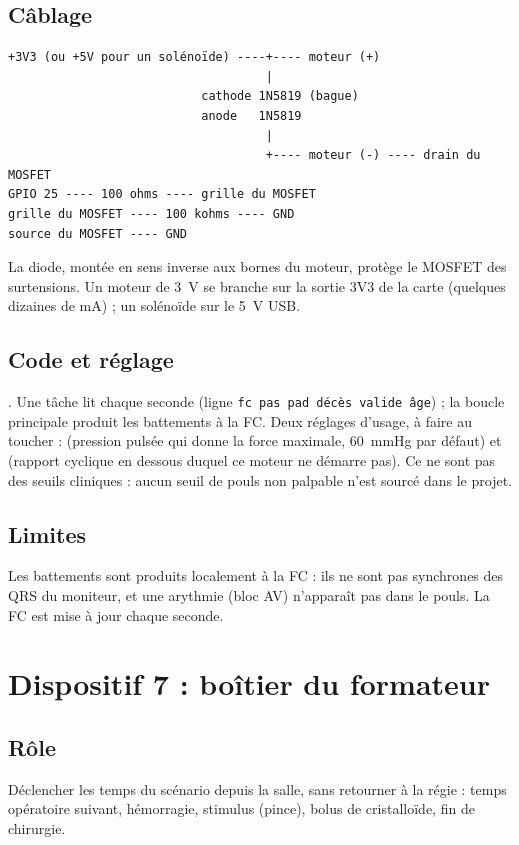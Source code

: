 \documentclass[11pt,a4paper]{article}
\newcommand{\cmd}[1]{\texttt{\detokenize{#1}}}  %
\begin{document}
\subsection{Câblage}
\begin{Verbatim}
+3V3 (ou +5V pour un solénoïde) ----+---- moteur (+)
                                    |
                           cathode 1N5819 (bague)
                           anode   1N5819
                                    |
                                    +---- moteur (-) ---- drain du MOSFET
GPIO 25 ---- 100 ohms ---- grille du MOSFET
grille du MOSFET ---- 100 kohms ---- GND
source du MOSFET ---- GND
\end{Verbatim}
La diode, montée en sens inverse aux bornes du moteur, protège le MOSFET des surtensions. Un moteur de 3~V se
branche sur la sortie 3V3 de la carte (quelques dizaines de mA) ; un solénoïde sur le 5~V USB.

\subsection{Code et réglage}
. Une tâche lit \cmd{GET /api/pulse} chaque seconde (ligne
\texttt{fc pas pad décès valide âge}) ; la boucle principale produit les battements à la FC. Deux réglages d'usage, à
faire au toucher :  (pression pulsée qui donne la force maximale, 60~mmHg par défaut) et
 (rapport cyclique en dessous duquel ce moteur ne démarre pas). Ce ne sont pas des seuils
cliniques : aucun seuil de \og pouls non palpable \fg{} n'est sourcé dans le projet.

\subsection{Limites}
Les battements sont produits localement à la FC : ils ne sont pas synchrones des QRS du moniteur, et une arythmie
(bloc AV) n'apparaît pas dans le pouls. La FC est mise à jour chaque seconde.

\section{Dispositif 7 : boîtier du formateur}
\subsection{Rôle}
Déclencher les temps du scénario depuis la salle, sans retourner à la régie : temps opératoire suivant, hémorragie,
stimulus (pince), bolus de cristalloïde, fin de chirurgie.
\end{document}
